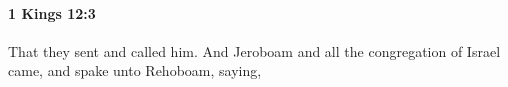 
		\paragraph{1 Kings 12:3} %
			\label{1KINGS-12-3}

			That they sent and called him. And Jeroboam and all the congregation of Israel came, and spake unto Rehoboam, saying,


